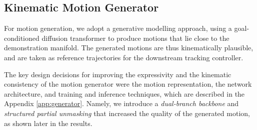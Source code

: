 \documentclass{article}
\newcommand{\papertitle}{Humanoid-DART}
\begin{document}




\subsection{Kinematic Motion Generator}\label{sec:kinematic_motion_generator}
For motion generation, we adopt a generative modelling approach, using a goal-conditioned diffusion transformer to produce motions that lie close to the demonstration manifold. The generated motions are thus kinematically plausible, and are taken as reference trajectories for the downstream tracking controller.

The key design decisions for improving the expressivity and the kinematic consistency of the motion generator were the motion representation, the network architecture, and training and inference techniques, which are described in the Appendix \ref{app:generator}. Namely, we introduce a \textit{dual-branch backbone} and \textit{structured partial unmasking} that increased the quality of the generated motion, as shown later in the results.
\end{document}
